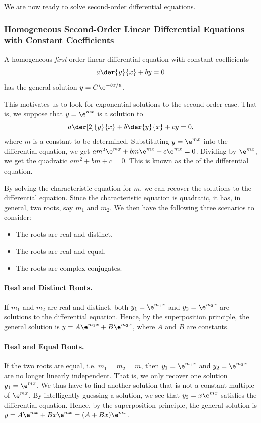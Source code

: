 We are now ready to solve second-order differential equations.

\subsubsection{Homogeneous Second-Order Linear Differential Equations with Constant Coefficients}

A homogeneous \emph{first}-order linear differential equation with constant coefficients \[a \der{y}{x} + by = 0\] has the general solution $y = C \e^{-bx/a}$.

This motivates us to look for exponential solutions to the second-order case. That is, we suppose that $y= \e^{mx}$ is a solution to \[a \der[2]{y}{x} + b \der{y}{x} + cy = 0,\] where $m$ is a constant to be determined. Substituting $y = \e^{mx}$ into the differential equation, we get $am^2 \e^{mx} + bm \e^{mx} + c\e^{mx} = 0$. Dividing by $\e^{mx}$, we get the quadratic $am^2 + bm + c = 0$. This is known as the  of the differential equation.

By solving the characteristic equation for $m$, we can recover the solutions to the differential equation. Since the characteristic equation is quadratic, it has, in general, two roots, say $m_1$ and $m_2$. We then have the following three scenarios to consider:
\begin{itemize}
    \item The roots are real and distinct.
    \item The roots are real and equal.
    \item The roots are complex conjugates.
\end{itemize}

\paragraph{Real and Distinct Roots.} If $m_1$ and $m_2$ are real and distinct, both $y_1 = \e^{m_1 x}$ and $y_2 = \e^{m_2 x}$ are solutions to the differential equation. Hence, by the superposition principle, the general solution is $y = A \e^{m_1 x} + B \e^{m_2 x}$, where $A$ and $B$ are constants.

\paragraph{Real and Equal Roots.} If the two roots are equal, i.e. $m_1 = m_2 = m$, then $y_1 = \e^{m_1 x}$ and $y_2 = \e^{m_2 x}$ are no longer linearly independent. That is, we only recover one solution $y_1 = \e^{mx}$. We thus have to find another solution that is not a constant multiple of $\e^{mx}$. By intelligently guessing a solution, we see that $y_2 = x \e^{mx}$ satisfies the differential equation. Hence, by the superposition principle, the general solution is $y = A \e^{mx} + Bx \e^{mx} = (A + Bx) \e^{mx}$.

